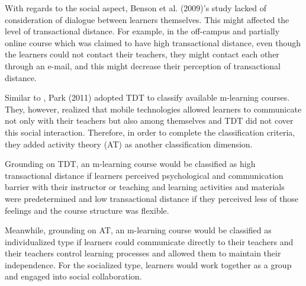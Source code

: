 With regards to the social aspect, Benson et al. (2009)'s study \cite{benson2009addressing} lacked of consideration of dialogue between learners themselves. This might affected the level of transactional distance. For example, in the off-campus and partially online course which was claimed to have high transactional distance, even though the learners could not contact their teachers, they might contact each other through an e-mail, and this might decrease their perception of transactional distance. 

Similar to \cite{benson2009addressing}, Park (2011)  \cite{park2011pedagogical} adopted TDT to classify available m-learning courses. They, however, realized that mobile technologies allowed learners to communicate not only with their teachers but also among themselves and TDT did not cover this social interaction. Therefore, in order to complete the classification criteria, they added activity theory (AT) as another classification dimension. 

Grounding on TDT, an m-learning course would be classified as high transactional distance if learners perceived psychological and communication barrier with their instructor or teaching and learning activities and materials were predetermined and low transactional distance if they perceived less of those feelings and the course structure was flexible. 

Meanwhile, grounding on AT, an m-learning course would be classified as individualized type if learners could communicate directly to their teachers and their teachers control learning processes and allowed them to maintain their independence. For the socialized type, learners would work together as a group and engaged into social collaboration. 

